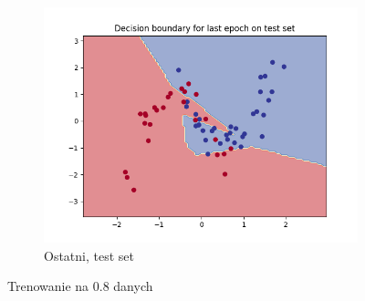 \documentclass[12pt]{article}
\newcommand*{\subfigwidth}{0.24\textwidth}
\begin{document}
\begin{figure}[H]
\begin{subfigure}[t]{\subfigwidth}
        \includegraphics[width=\linewidth]{img/exp_4/set_0.8/last/test_boundary.png}
        \caption{Ostatni, test set}
    \end{subfigure}
    \caption{Trenowanie na 0.8 danych}\label{fig:figure3}
\end{figure}
\end{document}
